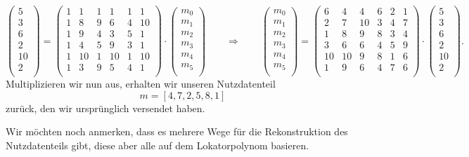 \[
\begin{pmatrix}
	5 \\ 3 \\ 6 \\ 2 \\ 10 \\ 2 \\
\end{pmatrix}
=
\begin{pmatrix}
	1&  1& 1&  1& 1&  1\\
	1&  8& 9&  6& 4& 10\\
	1&  9& 4&  3& 5&  1\\
	1&  4& 5&  9& 3&  1\\
	1& 10& 1& 10& 1& 10\\
	1&  3& 9&  5& 4&  1\\
\end{pmatrix}
\cdot
\begin{pmatrix}
	m_0 \\ m_1 \\ m_2 \\ m_3 \\ m_4 \\ m_5 \\
\end{pmatrix}
\qquad
\Rightarrow
\qquad
\begin{pmatrix}
	m_0 \\ m_1 \\ m_2 \\ m_3 \\ m_4 \\ m_5 \\
\end{pmatrix}
=
\begin{pmatrix}
	6&  4&  4&  6& 2&  1\\
	2&  7& 10&  3& 4&  7\\
	1&  8&  9&  8& 3&  4\\
	3&  6&  6&  4& 5&  9\\
	10& 10&  9&  8& 1&  6\\
	1&  9&  6&  4& 7&  6\\
\end{pmatrix}
\cdot
\begin{pmatrix}
	5 \\ 3 \\ 6 \\ 2 \\ 10 \\ 2 \\
\end{pmatrix}.
\]
Multiplizieren wir nun aus, erhalten wir unseren Nutzdatenteil
\[
m = [4,7,2,5,8,1]
\]
zurück, den wir ursprünglich versendet haben.

Wir möchten noch anmerken, dass es mehrere Wege für die Rekonstruktion des Nutzdatenteils gibt, diese aber alle auf dem Lokatorpolynom basieren. 

